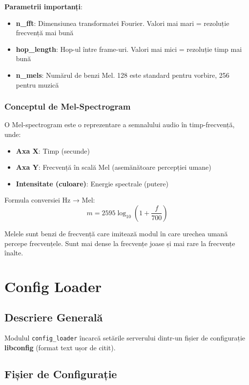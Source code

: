 \documentclass[12pt,a4paper,oneside]{book}
\newcommand{\warningbox}[1]{
\begin{tcolorbox}[colback=yellow!10,colframe=orange,title=\textbf{Atenție}]
#1
\end{tcolorbox}
}
\begin{document}
\warningbox{
\textbf{Parametrii importanți}:
\begin{itemize}
    \item \textbf{n\_fft}: Dimensiunea transformatei Fourier. Valori mai mari = rezoluție frecvență mai bună
    \item \textbf{hop\_length}: Hop-ul între frame-uri. Valori mai mici = rezoluție timp mai bună
    \item \textbf{n\_mels}: Numărul de benzi Mel. 128 este standard pentru vorbire, 256 pentru muzică
\end{itemize}
}

\subsubsection{Conceptul de Mel-Spectrogram}

\begin{tcolorbox}[colback=lightblue,colframe=darkblue,title=Ce este o Mel-Spectrogram?]
O Mel-spectrogram este o reprezentare a semnalului audio în timp-frecvență, unde:
\begin{itemize}
    \item \textbf{Axa X}: Timp (secunde)
    \item \textbf{Axa Y}: Frecvență în scală Mel (asemănătoare percepției umane)
    \item \textbf{Intensitate (culoare)}: Energie spectrale (putere)
\end{itemize}

Formula conversiei Hz → Mel:
$$m = 2595 \log_{10}\left(1 + \frac{f}{700}\right)$$

Melele sunt benzi de frecvență care imitează modul în care urechea umană percepe frecvențele. Sunt mai dense la frecvențe joase și mai rare la frecvențe înalte.
\end{tcolorbox}

\section{Config Loader}

\subsection{Descriere Generală}

Modulul \texttt{config\_loader} încarcă setările serverului dintr-un fișier de configurație \textbf{libconfig} (format text ușor de citit).

\subsection{Fișier de Configurație}
\end{document}
